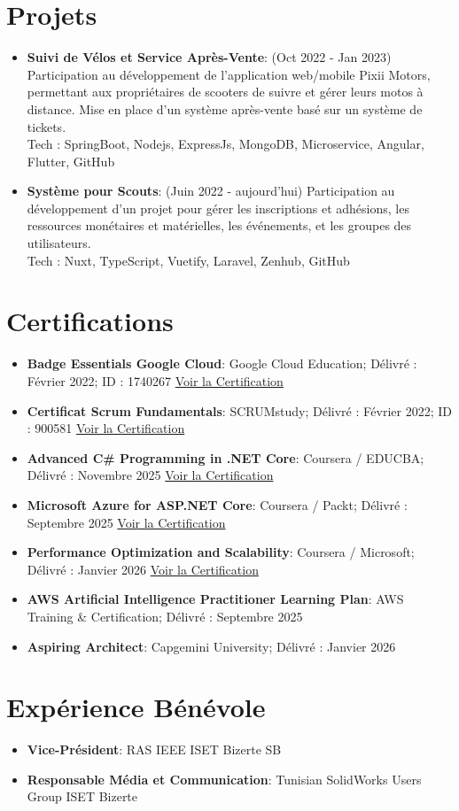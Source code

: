 \documentclass[a4paper,20pt]{article}
\newcommand{\resumeItem}[2]{
  \item\small{
    \textbf{#1}{: #2 \vspace{-2pt}}
  }
}
\newcommand{\resumeSubItem}[2]{\resumeItem{#1}{#2}\vspace{-3pt}}
\newcommand{\resumeSubHeadingListStart}{\begin{itemize}[leftmargin=*]}
\newcommand{\resumeSubHeadingListEnd}{\end{itemize}}
\begin{document}
\vspace{-5pt}
\section{Projets}
\resumeSubHeadingListStart
\resumeSubItem{Suivi de Vélos et Service Après-Vente}{(Oct 2022 - Jan 2023)
 Participation au développement de l'application web/mobile Pixii Motors, permettant aux propriétaires de scooters de suivre et gérer leurs motos à distance. Mise en place d'un système après-vente basé sur un système de tickets.
\\ Tech : SpringBoot, Nodejs, ExpressJs, MongoDB, Microservice, Angular, Flutter, GitHub}
\vspace{2pt}
\resumeSubItem{Système pour Scouts}{(Juin 2022 - aujourd'hui)
 Participation au développement d'un projet pour gérer les inscriptions et adhésions, les ressources monétaires et matérielles, les événements, et les groupes des utilisateurs.
\\ Tech : Nuxt, TypeScript, Vuetify, Laravel, Zenhub, GitHub}
\resumeSubHeadingListEnd

\vspace{-5pt}
\section{Certifications}
\resumeSubHeadingListStart
\resumeSubItem{Badge Essentials Google Cloud}
    {Google Cloud Education; Délivré : Février 2022; ID : 1740267}
    {\href{https://www.cloudskillsboost.google/public_profiles/b6cf5253-6dac-4b50-8a0d-7129daad930b/badges/1740267}{Voir la Certification}}
\resumeSubItem{Certificat Scrum Fundamentals}
    {SCRUMstudy; Délivré : Février 2022; ID : 900581}
    {\href{https://c46e136a583f7e334124-ac22991740ab4ff17e21daf2ed577041.ssl.cf1.rackcdn.com/Certificate/ScrumFundamentalsCertified-MohamedYoussefChlendi-900581.pdf}{Voir la Certification}}
\resumeSubItem{Advanced C\# Programming in .NET Core}
    {Coursera / EDUCBA; Délivré : Novembre 2025}
    {\href{https://coursera.org/verify/AHZ3PB7VHVW0}{Voir la Certification}}
\resumeSubItem{Microsoft Azure for ASP.NET Core}
    {Coursera / Packt; Délivré : Septembre 2025}
    {\href{https://coursera.org/verify/HTH0OZA64L2Z}{Voir la Certification}}
\resumeSubItem{Performance Optimization and Scalability}
    {Coursera / Microsoft; Délivré : Janvier 2026}
    {\href{https://coursera.org/verify/QW1S6J4EDX8C}{Voir la Certification}}
\resumeSubItem{AWS Artificial Intelligence Practitioner Learning Plan}
    {AWS Training \& Certification; Délivré : Septembre 2025}{}
\resumeSubItem{Aspiring Architect}
    {Capgemini University; Délivré : Janvier 2026}{}
\resumeSubHeadingListEnd

\vspace{-2pt}
\section{Expérience Bénévole}
\resumeSubHeadingListStart
\resumeItem{Vice-Président}{RAS IEEE ISET Bizerte SB}
\resumeItem{Responsable Média et Communication}{Tunisian SolidWorks Users Group ISET Bizerte}
\resumeSubHeadingListEnd
\end{document}
